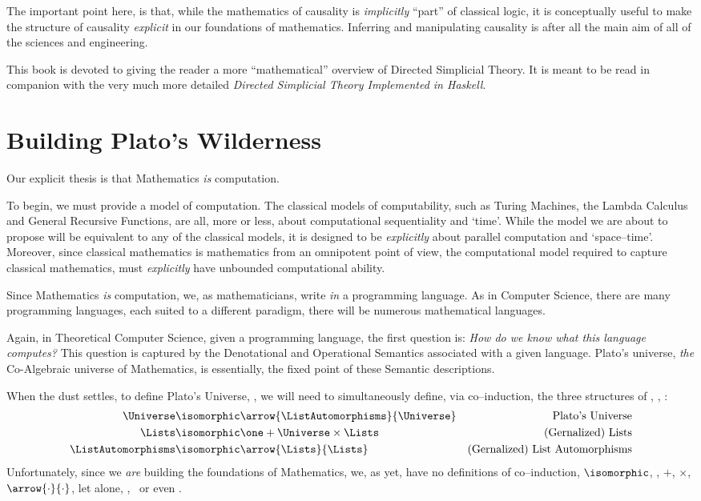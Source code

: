 \documentclass[a4paper,openany]{amsbook}
\begin{document}
The important point here, is that, while the mathematics of causality is
\emph{implicitly} ``part'' of classical logic, it is conceptually useful to make
the structure of causality \emph{explicit} in our foundations of mathematics. 
Inferring and manipulating causality is after all the main aim of all of the
sciences and engineering.

This book is devoted to giving the reader a more ``mathematical'' overview of
Directed Simplicial Theory.  It is meant to be read in companion with the very
much more detailed \textit{Directed Simplicial Theory Implemented in Haskell}.

\section{Building Plato's Wilderness}

Our explicit thesis is that Mathematics \emph{is} computation.

To begin, we must provide a model of computation. The classical models of
computability, such as Turing Machines, the Lambda Calculus and General
Recursive Functions, are all, more or less, about computational sequentiality
and `time'. While the model we are about to propose will be equivalent to any of
the classical models, it is designed to be \emph{explicitly} about parallel
computation and `space--time'. Moreover, since classical mathematics is
mathematics from an omnipotent point of view, the computational model required
to capture classical mathematics, must \emph{explicitly} have unbounded
computational ability.

Since Mathematics \emph{is} computation, we, as mathematicians, write \emph{in}
a programming language. As in Computer Science, there are many programming
languages, each suited to a different paradigm, there will be numerous
mathematical languages.

Again, in Theoretical Computer Science, given a programming language, the first
question is: \emph{How do we know what this language computes?} This question is
captured by the Denotational and Operational Semantics associated with a given
language. Plato's universe, \emph{the} Co-Algebraic universe of Mathematics,
is essentially, the fixed point of these Semantic descriptions.

When the dust settles, to define Plato's Universe, \Universe, we will need to
simultaneously define, via co--induction, the three structures of \Universe,
\Lists, \ListAutomorphisms:
%
\begin{align}
   \Universe          & \isomorphic \arrow{\ListAutomorphisms}{\Universe} & \text{Plato's Universe} \\
   \Lists             & \isomorphic \one + \Universe \times \Lists        & \text{(Gernalized) Lists} \\
   \ListAutomorphisms & \isomorphic \arrow{\Lists}{\Lists}                & \text{(Gernalized) List Automorphisms}
\end{align}
%
Unfortunately, since we \emph{are} building the foundations of Mathematics, we,
as yet, have no definitions of co--induction, $\isomorphic$, \one, $+$, $\times$,
$\arrow{\cdot}{\cdot}$, let alone, \Universe, \Lists\ or even \ListAutomorphisms.
\end{document}
